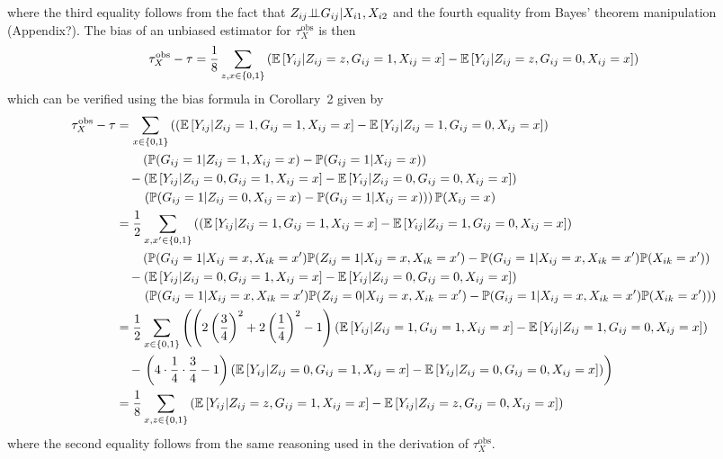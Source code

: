 \documentclass[10pt]{article}
\begin{document}
where the third equality follows from the fact that $Z_{ij}{\perp\!\!\!\perp} G_{ij}|X_{i1},X_{i2}$ and the fourth equality from Bayes' theorem manipulation (\todo Appendix?). The bias of an unbiased estimator for $\tau_{X}^\text{obs}$ is then
\[
\tau_{X}^\text{obs} - \tau = \frac{1}{8}\sum_{z,x\in\{0,1\}}\left(\mathbb{E}\left[Y_{ij}|Z_{ij}=z,G_{ij}=1,X_{ij}=x\right] - \mathbb{E}\left[Y_{ij}|Z_{ij}=z,G_{ij}=0,X_{ij}=x\right]\right)
\]
which can be verified using the bias formula in Corollary~2 given by
\begin{align*}
\tau_{X}^\text{obs} - \tau &= \sum_{x\in\{0,1\}} \left(\left(\mathbb{E}\left[Y_{ij}|Z_{ij}=1,G_{ij}=1,X_{ij}=x\right] - \mathbb{E}\left[Y_{ij}|Z_{ij}=1,G_{ij}=0,X_{ij}=x\right]\right)\right. \\
&\qquad \left(\mathbb{P}(G_{ij}=1|Z_{ij}=1,X_{ij}=x)-\mathbb{P}(G_{ij}=1|X_{ij}=x)\right) \\
&\quad - \left(\mathbb{E}\left[Y_{ij}|Z_{ij}=0,G_{ij}=1,X_{ij}=x\right] - \mathbb{E}\left[Y_{ij}|Z_{ij}=0,G_{ij}=0,X_{ij}=x\right]\right) \\
&\qquad \left.\left(\mathbb{P}(G_{ij}=1|Z_{ij}=0,X_{ij}=x)-\mathbb{P}(G_{ij}=1|X_{ij}=x)\right)\right)\mathbb{P}(X_{ij}=x) \\
&= \frac{1}{2}\sum_{x,x'\in\{0,1\}} \left(\left(\mathbb{E}\left[Y_{ij}|Z_{ij}=1,G_{ij}=1,X_{ij}=x\right] - \mathbb{E}\left[Y_{ij}|Z_{ij}=1,G_{ij}=0,X_{ij}=x\right]\right)\right. \\
&\qquad \left(\mathbb{P}(G_{ij}=1|X_{ij}=x,X_{ik}=x')\mathbb{P}(Z_{ij}=1|X_{ij}=x,X_{ik}=x')-\mathbb{P}(G_{ij}=1|X_{ij}=x,X_{ik}=x')\mathbb{P}(X_{ik}=x')\right) \\
&\quad - \left(\mathbb{E}\left[Y_{ij}|Z_{ij}=0,G_{ij}=1,X_{ij}=x\right] - \mathbb{E}\left[Y_{ij}|Z_{ij}=0,G_{ij}=0,X_{ij}=x\right]\right) \\
&\qquad \left.\left(\mathbb{P}(G_{ij}=1|X_{ij}=x,X_{ik}=x')\mathbb{P}(Z_{ij}=0|X_{ij}=x,X_{ik}=x')-\mathbb{P}(G_{ij}=1|X_{ij}=x,X_{ik}=x')\mathbb{P}(X_{ik}=x')\right)\right) \\
&= \frac{1}{2}\sum_{x\in\{0,1\}}\left(\left(2\left(\frac{3}{4}\right)^2+2\left(\frac{1}{4}\right)^2 - 1\right)\left(\mathbb{E}\left[Y_{ij}|Z_{ij}=1,G_{ij}=1,X_{ij}=x\right] - \mathbb{E}\left[Y_{ij}|Z_{ij}=1,G_{ij}=0,X_{ij}=x\right]\right)\right. \\
&\quad - \left.\left(4\cdot\frac{1}{4}\cdot\frac{3}{4} - 1\right)\left(\mathbb{E}\left[Y_{ij}|Z_{ij}=0,G_{ij}=1,X_{ij}=x\right] - \mathbb{E}\left[Y_{ij}|Z_{ij}=0,G_{ij}=0,X_{ij}=x\right]\right)\right) \\
&= \frac{1}{8}\sum_{x,z\in\{0,1\}}\left(\mathbb{E}\left[Y_{ij}|Z_{ij}=z,G_{ij}=1,X_{ij}=x\right] - \mathbb{E}\left[Y_{ij}|Z_{ij}=z,G_{ij}=0,X_{ij}=x\right]\right)
\end{align*}
where the second equality follows from the same reasoning used in the derivation of $\tau_X^\text{obs}$.
\end{document}
